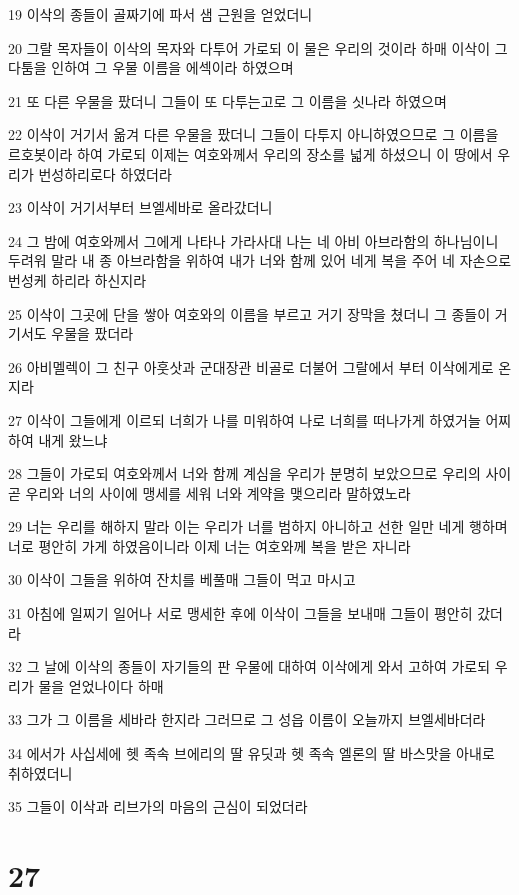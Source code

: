\par 19 이삭의 종들이 골짜기에 파서 샘 근원을 얻었더니
\par 20 그랄 목자들이 이삭의 목자와 다투어 가로되 이 물은 우리의 것이라 하매 이삭이 그 다툼을 인하여 그 우물 이름을 에섹이라 하였으며
\par 21 또 다른 우물을 팠더니 그들이 또 다투는고로 그 이름을 싯나라 하였으며
\par 22 이삭이 거기서 옮겨 다른 우물을 팠더니 그들이 다투지 아니하였으므로 그 이름을 르호봇이라 하여 가로되 이제는 여호와께서 우리의 장소를 넓게 하셨으니 이 땅에서 우리가 번성하리로다 하였더라
\par 23 이삭이 거기서부터 브엘세바로 올라갔더니
\par 24 그 밤에 여호와께서 그에게 나타나 가라사대 나는 네 아비 아브라함의 하나님이니 두려워 말라 내 종 아브라함을 위하여 내가 너와 함께 있어 네게 복을 주어 네 자손으로 번성케 하리라 하신지라
\par 25 이삭이 그곳에 단을 쌓아 여호와의 이름을 부르고 거기 장막을 쳤더니 그 종들이 거기서도 우물을 팠더라
\par 26 아비멜렉이 그 친구 아훗삿과 군대장관 비골로 더불어 그랄에서 부터 이삭에게로 온지라
\par 27 이삭이 그들에게 이르되 너희가 나를 미워하여 나로 너희를 떠나가게 하였거늘 어찌하여 내게 왔느냐
\par 28 그들이 가로되 여호와께서 너와 함께 계심을 우리가 분명히 보았으므로 우리의 사이 곧 우리와 너의 사이에 맹세를 세워 너와 계약을 맺으리라 말하였노라
\par 29 너는 우리를 해하지 말라 이는 우리가 너를 범하지 아니하고 선한 일만 네게 행하며 너로 평안히 가게 하였음이니라 이제 너는 여호와께 복을 받은 자니라
\par 30 이삭이 그들을 위하여 잔치를 베풀매 그들이 먹고 마시고
\par 31 아침에 일찌기 일어나 서로 맹세한 후에 이삭이 그들을 보내매 그들이 평안히 갔더라
\par 32 그 날에 이삭의 종들이 자기들의 판 우물에 대하여 이삭에게 와서 고하여 가로되 우리가 물을 얻었나이다 하매
\par 33 그가 그 이름을 세바라 한지라 그러므로 그 성읍 이름이 오늘까지 브엘세바더라
\par 34 에서가 사십세에 헷 족속 브에리의 딸 유딧과 헷 족속 엘론의 딸 바스맛을 아내로 취하였더니
\par 35 그들이 이삭과 리브가의 마음의 근심이 되었더라

\chapter{27}

